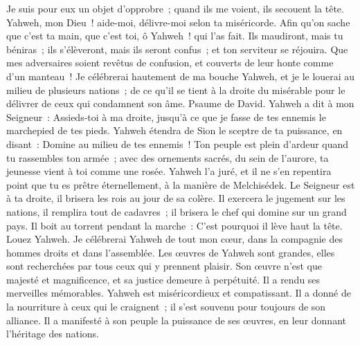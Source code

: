 \begin{multicols}{2}
Je suis pour eux un objet d'opprobre~; quand ils me voient, ils secouent la tête.
Yahweh, mon Dieu~! aide-moi, délivre-moi selon ta miséricorde.
Afin qu'on sache que c'est ta main, que c'est toi, ô Yahweh~! qui l'as fait.
Ils maudiront, mais tu béniras~; ils s'élèveront, mais ils seront confus~; et ton serviteur se réjouira.
Que mes adversaires soient revêtus de confusion, et couverts de leur honte comme d'un manteau~!
Je célébrerai hautement de ma bouche Yahweh, et je le louerai au milieu de plusieurs nations~;
de ce qu'il se tient à la droite du misérable pour le délivrer de ceux qui condamnent son âme.
\VerseOne{}Psaume de David. Yahweh a dit à mon Seigneur~: Assieds-toi à ma droite, jusqu'à ce que je fasse de tes ennemis le marchepied de tes pieds.
Yahweh étendra de Sion le sceptre de ta puissance, en disant~: Domine au milieu de tes ennemis~!
Ton peuple est plein d'ardeur quand tu rassembles ton armée~; avec des ornements sacrés, du sein de l'aurore, ta jeunesse vient à toi comme une rosée.
Yahweh l'a juré, et il ne s'en repentira point que tu es prêtre éternellement, à la manière de Melchisédek.
Le Seigneur est à ta droite, il brisera les rois au jour de sa colère.
Il exercera le jugement sur les nations, il remplira tout de cadavres~; il brisera le chef qui domine sur un grand pays.
Il boit au torrent pendant la marche~: C'est pourquoi il lève haut la tête.
\VerseOne{}Louez Yahweh.  Je célébrerai Yahweh de tout mon cœur,  dans la compagnie des hommes droits et dans l'assemblée.
 Les œuvres de Yahweh sont grandes,  elles sont recherchées par tous ceux qui y prennent plaisir.
 Son œuvre n'est que majesté et magnificence,  et sa justice demeure à perpétuité.
 Il a rendu ses merveilles mémorables.  Yahweh est miséricordieux et compatissant.
 Il a donné de la nourriture à ceux qui le craignent~;  il s'est souvenu pour toujours de son alliance.
 Il a manifesté à son peuple la puissance de ses œuvres,  en leur donnant l'héritage des nations.

\end{multicols}
